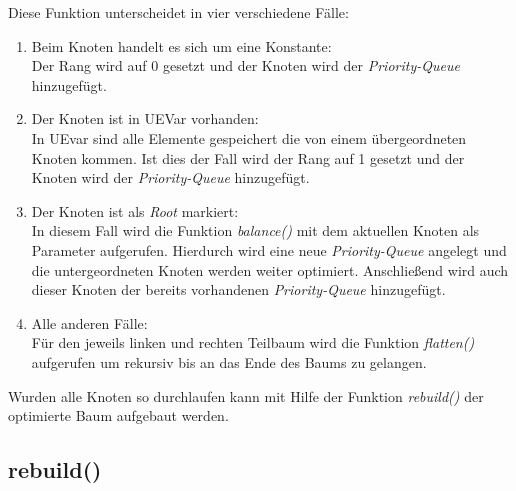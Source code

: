 Diese Funktion unterscheidet in vier verschiedene Fälle:
\begin{enumerate}
	\item Beim Knoten handelt es sich um eine Konstante:\\
	Der Rang wird auf 0 gesetzt und der Knoten wird der \textit{Priority-Queue} hinzugefügt.
	\item Der Knoten ist in UEVar vorhanden:\\
	In UEvar sind alle Elemente gespeichert die von einem übergeordneten Knoten kommen. Ist dies der Fall wird der Rang auf 1 gesetzt und der Knoten wird der \textit{Priority-Queue} hinzugefügt.
	\item Der Knoten ist als \textit{Root} markiert:\\
	In diesem Fall wird die Funktion \textit{balance()} mit dem aktuellen Knoten als Parameter aufgerufen. Hierdurch wird eine neue \textit{Priority-Queue} angelegt und die untergeordneten Knoten werden weiter optimiert. Anschließend wird auch dieser Knoten der bereits vorhandenen \textit{Priority-Queue} hinzugefügt.
	\item Alle anderen Fälle:\\
	Für den jeweils linken und rechten Teilbaum wird die Funktion \textit{flatten()} aufgerufen um rekursiv bis an das Ende des Baums zu gelangen.
\end{enumerate}

Wurden alle Knoten so durchlaufen kann mit Hilfe der Funktion \textit{rebuild()} der optimierte Baum aufgebaut werden.

\subsection{rebuild()}
